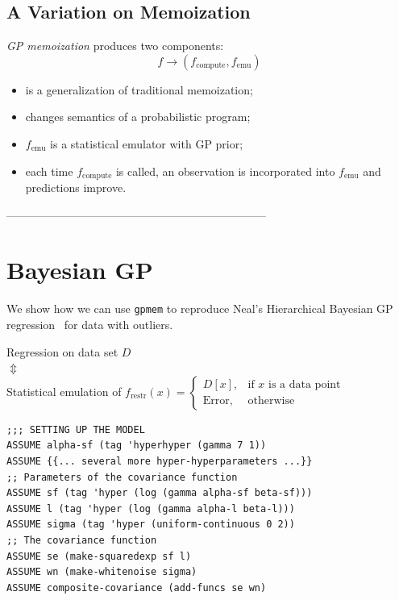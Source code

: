 \documentclass[a0,portrait]{a0poster}
\newcommand{\compute}{{\textrm{compute}}}
\newcommand{\emu}{{\textrm{emu}}}
\newcommand{\restr}{{\textrm{restr}}}
\begin{document}
\begin{multicols}{3}
\subsection*{A Variation on Memoization}
{\em GP memoization} produces two components:
\[ f \to (f_\compute, f_\emu) \]
\begin{itemize}
\setlength{\itemindent}{1cm}
 \item is a generalization of traditional memoization;
 \item changes semantics of a probabilistic program;
 \item $f_\emu$ is a statistical emulator with GP prior;
 \item each time $f_\compute$ is called, an observation is incorporated into $f_\emu$ and predictions improve.
\end{itemize}


---------------------------------------------------------------------


\section*{Bayesian GP}

We show how we can use  {\tt gpmem} to reproduce Neal's Hierarchical Bayesian GP regression~\cite{neal1997monte} for data with outliers.

\begin{center}
Regression on data set $D$ \\
$\Updownarrow$ \\
Statistical emulation of $f_\restr(x) = \begin{cases}
      D[x], & \text{if $x$ is a data point} \\
      \text{Error}, & \text{otherwise}
    \end{cases}$
\end{center}
\begin{minipage}{\linewidth}
\belowcaptionskip=-10pt
\begin{lstlisting}[frame=single,caption=Hierarchical  GP Smoothing,mathescape,label=alg:gphierarch]
;;; SETTING UP THE MODEL
ASSUME alpha-sf (tag 'hyperhyper (gamma 7 1))
ASSUME {{... several more hyper-hyperparameters ...}}
;; Parameters of the covariance function
ASSUME sf (tag 'hyper (log (gamma alpha-sf beta-sf)))
ASSUME l (tag 'hyper (log (gamma alpha-l beta-l)))
ASSUME sigma (tag 'hyper (uniform-continuous 0 2))
;; The covariance function
ASSUME se (make-squaredexp sf l)
ASSUME wn (make-whitenoise sigma)
ASSUME composite-covariance (add-funcs se wn)


\end{lstlisting}
\end{minipage}
\end{multicols}
\end{document}

